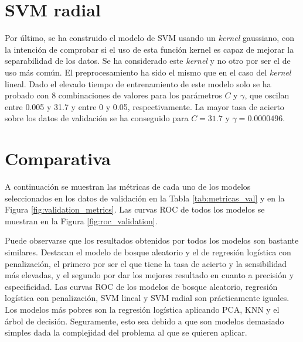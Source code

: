 \documentclass[12pt,a4paper,]{book}
\numberwithin{dummy}{section}
\theoremstyle{ocrenumbox}
\theoremstyle{blacknumex}
\theoremstyle{blacknumbox}
\theoremstyle{ocrenum}
\theoremstyle{ocrenum}
\begin{document}
\hypertarget{svm-radial}{%
\section{SVM radial}\label{svm-radial}}

Por último, se ha construido el modelo de SVM usando un \emph{kernel}
gaussiano, con la intención de comprobar si el uso de esta función
kernel es capaz de mejorar la separabilidad de los datos. Se ha
considerado este \emph{kernel} y no otro por ser el de uso más común. El
preprocesamiento ha sido el mismo que en el caso del \emph{kernel}
lineal. Dado el elevado tiempo de entrenamiento de este modelo solo se
ha probado con 8 combinaciones de valores para los parámetros \(C\) y
\(\gamma\), que oscilan entre 0.005 y 31.7 y entre 0 y 0.05,
respectivamente. La mayor tasa de acierto sobre los datos de validación
se ha conseguido para \(C = 31.7\) y \(\gamma = 0.0000496\).

\hypertarget{comparativa}{%
\section{Comparativa}\label{comparativa}}

A continuación se muestran las métricas de cada uno de los modelos
seleccionados en los datos de validación en la Tabla
\ref{tab:metricas_val} y en la Figura \ref{fig:validation_metrics}. Las
curvas ROC de todos los modelos se muestran en la Figura
\ref{fig:roc_validation}.

Puede observarse que los resultados obtenidos por todos los modelos son
bastante similares. Destacan el modelo de bosque aleatorio y el de
regresión logística con penalización, el primero por ser el que tiene la
tasa de acierto y la sensibilidad más elevadas, y el segundo por dar los
mejores resultado en cuanto a precisión y especificidad. Las curvas ROC
de los modelos de bosque aleatorio, regresión logística con
penalización, SVM lineal y SVM radial son prácticamente iguales. Los
modelos más pobres son la regresión logística aplicando PCA, KNN y el
árbol de decisión. Seguramente, esto sea debido a que son modelos
demasiado simples dada la complejidad del problema al que se quieren
aplicar.
\end{document}

